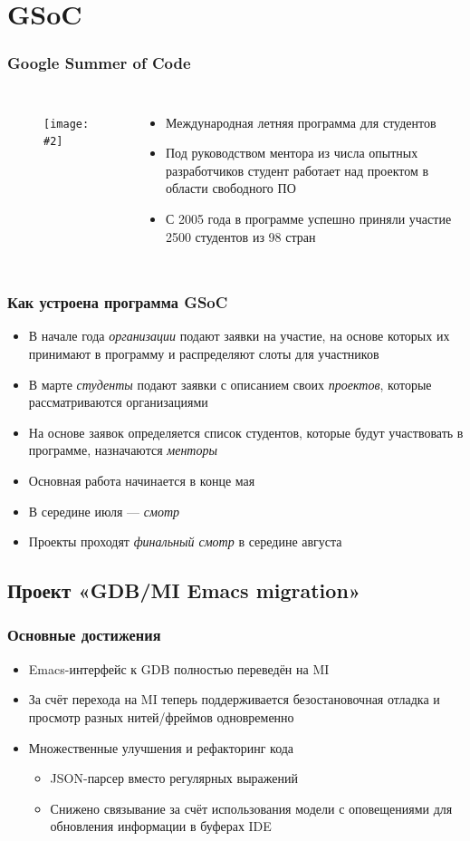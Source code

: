 \documentclass[onlymath]{beamer}
\newcommand\neword\emph
\newcommand{\cenfig}[2]{\begin{figure}\centering\texttt{[image: \#2]}
  \end{figure}}
\begin{document}
\section{GSoC}
\begin{frame}
  \frametitle{Google Summer of Code}
  \begin{columns}
    \cenfig{0.1}{google.jpg}
  \begin{itemize}
  \item Международная летняя программа для студентов
  \item Под руководством ментора из числа опытных разработчиков
    студент работает над проектом в области свободного \textsc{ПО}
  \item С 2005 года в программе успешно приняли участие 2500 студентов
    из 98 стран
  \end{itemize}
\end{columns}
\end{frame}

\begin{frame}
  \frametitle{Как устроена программа GSoC}
  \begin{itemize}
  \item В начале года \neword{организации} подают заявки на участие,
    на основе которых их принимают в программу и распределяют слоты
    для участников
  \item В марте \neword{студенты} подают заявки с описанием своих
    \neword{проектов}, которые рассматриваются организациями
  \item На основе заявок определяется список студентов, которые будут
    участвовать в программе, назначаются \neword{менторы}
  \item Основная работа начинается в конце мая
  \item В середине июля — \neword{смотр}
  \item Проекты проходят \neword{финальный смотр} в середине августа
  \end{itemize}
\end{frame}

\subsection{Проект «GDB/MI Emacs migration»}
\begin{frame}
  \frametitle{Основные достижения}
  \begin{itemize}
  \item Emacs-интерфейс к GDB полностью переведён на MI
  \item За счёт перехода на MI теперь поддерживается безостановочная
    отладка и просмотр разных нитей/фреймов одновременно
  \item Множественные улучшения и рефакторинг кода
    \begin{itemize}
    \item JSON-парсер вместо регулярных выражений
    \item Снижено связывание за счёт использования модели с оповещениями
      для обновления информации в буферах IDE
    \end{itemize}
  \end{itemize}
\end{frame}
\end{document}
